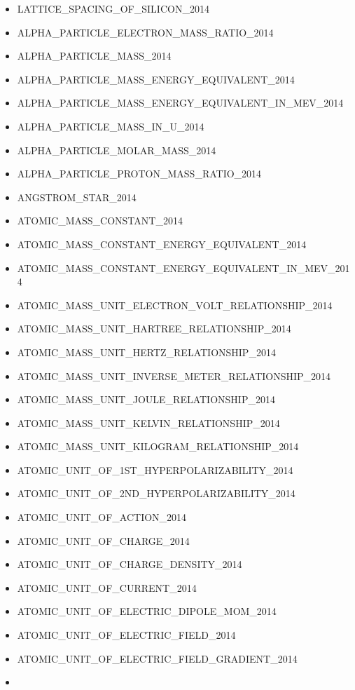 \begin{itemize}
\item
  LATTICE\_SPACING\_OF\_SILICON\_2014
\item
  ALPHA\_PARTICLE\_ELECTRON\_MASS\_RATIO\_2014
\item
  ALPHA\_PARTICLE\_MASS\_2014
\item
  ALPHA\_PARTICLE\_MASS\_ENERGY\_EQUIVALENT\_2014
\item
  ALPHA\_PARTICLE\_MASS\_ENERGY\_EQUIVALENT\_IN\_MEV\_2014
\item
  ALPHA\_PARTICLE\_MASS\_IN\_U\_2014
\item
  ALPHA\_PARTICLE\_MOLAR\_MASS\_2014
\item
  ALPHA\_PARTICLE\_PROTON\_MASS\_RATIO\_2014
\item
  ANGSTROM\_STAR\_2014
\item
  ATOMIC\_MASS\_CONSTANT\_2014
\item
  ATOMIC\_MASS\_CONSTANT\_ENERGY\_EQUIVALENT\_2014
\item
  ATOMIC\_MASS\_CONSTANT\_ENERGY\_EQUIVALENT\_IN\_MEV\_2014
\item
  ATOMIC\_MASS\_UNIT\_ELECTRON\_VOLT\_RELATIONSHIP\_2014
\item
  ATOMIC\_MASS\_UNIT\_HARTREE\_RELATIONSHIP\_2014
\item
  ATOMIC\_MASS\_UNIT\_HERTZ\_RELATIONSHIP\_2014
\item
  ATOMIC\_MASS\_UNIT\_INVERSE\_METER\_RELATIONSHIP\_2014
\item
  ATOMIC\_MASS\_UNIT\_JOULE\_RELATIONSHIP\_2014
\item
  ATOMIC\_MASS\_UNIT\_KELVIN\_RELATIONSHIP\_2014
\item
  ATOMIC\_MASS\_UNIT\_KILOGRAM\_RELATIONSHIP\_2014
\item
  ATOMIC\_UNIT\_OF\_1ST\_HYPERPOLARIZABILITY\_2014
\item
  ATOMIC\_UNIT\_OF\_2ND\_HYPERPOLARIZABILITY\_2014
\item
  ATOMIC\_UNIT\_OF\_ACTION\_2014
\item
  ATOMIC\_UNIT\_OF\_CHARGE\_2014
\item
  ATOMIC\_UNIT\_OF\_CHARGE\_DENSITY\_2014
\item
  ATOMIC\_UNIT\_OF\_CURRENT\_2014
\item
  ATOMIC\_UNIT\_OF\_ELECTRIC\_DIPOLE\_MOM\_2014
\item
  ATOMIC\_UNIT\_OF\_ELECTRIC\_FIELD\_2014
\item
  ATOMIC\_UNIT\_OF\_ELECTRIC\_FIELD\_GRADIENT\_2014
\item

\end{itemize}
